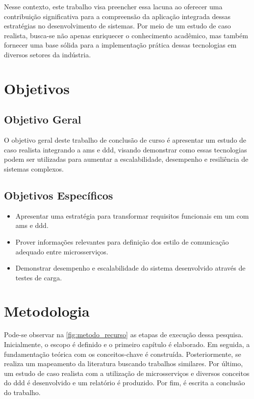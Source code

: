 Nesse contexto, este trabalho visa preencher essa lacuna ao oferecer uma contribuição significativa para a compreensão da aplicação integrada dessas estratégias no desenvolvimento de sistemas. Por meio de um estudo de caso realista, busca-se não apenas enriquecer o conhecimento acadêmico, mas também fornecer uma base sólida para a implementação prática dessas tecnologias em diversos setores da indústria.

\section{Objetivos}

\subsection{Objetivo Geral}
O objetivo geral deste trabalho de conclusão de curso é apresentar um estudo de caso realista integrando a \acrshort{ams} e \acrshort{ddd}, visando demonstrar como essas tecnologias podem ser utilizadas para aumentar a escalabilidade, desempenho e resiliência de sistemas complexos.


\subsection{Objetivos Específicos}
\begin{itemize}
\item Apresentar uma estratégia para transformar requisitos funcionais em um  com \acrshort{ams} e \acrshort{ddd}.
\item Prover informações relevantes para definição dos estilo de comunicação adequado entre microsserviços.
\item Demonstrar desempenho e escalabilidade do sistema desenvolvido através de testes de carga.
\end{itemize}

\section{Metodologia}
Pode-se observar na \autoref{fig:metodo_recurso} as etapas de execução dessa pesquisa. Inicialmente, o escopo é definido e o primeiro capítulo é elaborado. Em seguida, a fundamentação teórica com os conceitos-chave é construída. Posteriormente, se realiza um mapeamento da literatura buscando trabalhos similares. Por último, um estudo de caso realista com a utilização de microsserviços e diversos conceitos do \acrshort{ddd} é desenvolvido e um relatório é produzido. Por fim, é escrita a conclusão do trabalho.


